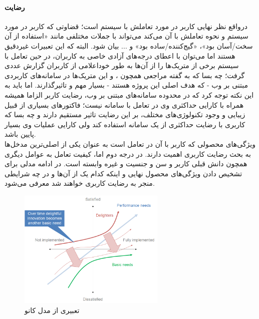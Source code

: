 \paragraph{رضایت}
درواقع نظر نهایی کاربر در مورد تعاملش با سیستم است؛ قضاوتی که کاربر در مورد سیستم و نحوه تعاملش با آن می‌کند می‌تواند با جملات مختلفی مانند «استفاده از آن سخت/آسان بود»، «گیج‌کننده/ساده بود» و ... بیان شود. البته که این تعبیرات غیردقیق هستند اما می‌توان با اعطای درجه‌های آزادی خاصی به کاربران، در حین تعامل با سیستم برخی از متریک‌ها را از آن‌ها به طور خوداعلامی از کاربران گزارش عددی گرفت؛ چه بسا که به گفته مراجعی همچون
\cite{albert_measuring_2013}،
\cite{alonso-rios_usability:_2009} و
\cite{seffah_usability_2006}
این متریک‌ها در سامانه‌های کاربردی مبتنی بر وب - که هدف اصلی این پروژه هستند - بسیار مهم و تاثیرگذارند. اما باید به این نکته توجه کرد که در محدوده سامانه‌های مبتنی بر وب، رضایت کاربر الزاما همیشه همراه با کارایی حداکثری وی در تعامل با سامانه نیست؛ فاکتورهای بسیاری از قبیل زیبایی و وجود تکنولوژی‌های مختلف، بر این رضایت تاثیر مستقیم دارند و چه بسا که کاربری با رضایت حداکثری از یک سامانه استفاده کند ولی کارایی عملیات وی بسیار پایین باشد.\\
ویژگی‌های محصولی که کاربر با آن در تعامل است به عنوان یکی از اصلی‌ترین مدخل‌ها به بحث رضایت کاربری اهمیت دارند. در درجه دوم اما، کیفیت تعامل به عوامل دیگری همچون دانش قبلی کاربر و سن و جنسیت و غیره وابسته است. در ادامه مدلی برای تشخیص دادن ویژگی‌های محصول نهایی و اینکه کدام یک از آن‌ها و در چه شرایطی منجر به رضایت کاربری خواهند شد معرفی می‌شود.
\begin{figure}[H]
	\centering
	\includegraphics[width=7cm]{Resources/kano_model.PNG}
	\caption[تعبیری از مدل کانو]	{
		تعبیری از مدل کانو
		\cite{noauthor_kano_2018}
	}
	\label{fig:kano}
\end{figure}
